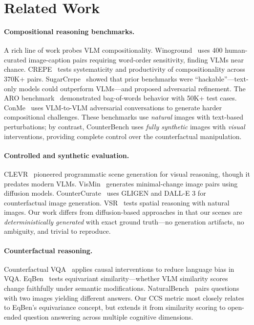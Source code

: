 \documentclass[10pt,twocolumn,letterpaper]{article}
\newcommand{\method}{CounterBench\xspace}
\newcommand{\ccs}{CCS\xspace}
\begin{document}
\section{Related Work}
\label{sec:related}

\paragraph{Compositional reasoning benchmarks.}
A rich line of work probes VLM compositionality. Winoground~\cite{thrush2022winoground} uses 400 human-curated image-caption pairs requiring word-order sensitivity, finding VLMs near chance. CREPE~\cite{ma2023crepe} tests systematicity and productivity of compositionality across 370K+ pairs. SugarCrepe~\cite{hsieh2023sugarcrepe} showed that prior benchmarks were ``hackable''---text-only models could outperform VLMs---and proposed adversarial refinement. The ARO benchmark~\cite{yuksekgonul2023aro} demonstrated bag-of-words behavior with 50K+ test cases. ConMe~\cite{huang2024conme} uses VLM-to-VLM adversarial conversations to generate harder compositional challenges. These benchmarks use \emph{natural} images with text-based perturbations; by contrast, \method uses \emph{fully synthetic} images with \emph{visual} interventions, providing complete control over the counterfactual manipulation.

\paragraph{Controlled and synthetic evaluation.}
CLEVR~\cite{johnson2017clevr} pioneered programmatic scene generation for visual reasoning, though it predates modern VLMs. VisMin~\cite{awal2024vismin} generates minimal-change image pairs using diffusion models. CounterCurate~\cite{zhang2024countercurate} uses GLIGEN and DALL-E 3 for counterfactual image generation. VSR~\cite{liu2023vsr} tests spatial reasoning with natural images. Our work differs from diffusion-based approaches in that our scenes are \emph{deterministically generated} with exact ground truth---no generation artifacts, no ambiguity, and trivial to reproduce.

\paragraph{Counterfactual reasoning.}
Counterfactual VQA~\cite{niu2021cfvqa} applies causal interventions to reduce language bias in VQA. EqBen~\cite{wang2023eqben} tests equivariant similarity---whether VLM similarity scores change faithfully under semantic modifications. NaturalBench~\cite{li2024naturalbench} pairs questions with two images yielding different answers. Our \ccs metric most closely relates to EqBen's equivariance concept, but extends it from similarity scoring to open-ended question answering across multiple cognitive dimensions.
\end{document}

